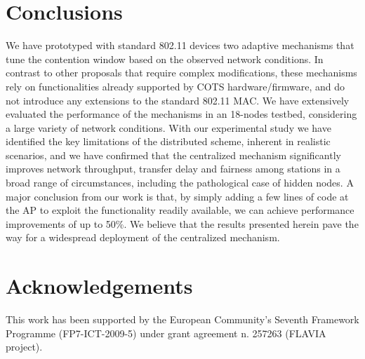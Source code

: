 \documentclass[a4paper,10pt]{article}
\begin{document}
\section{Conclusions}
\label{sec:conclusions}

We have prototyped with standard 802.11 devices two adaptive mechanisms that tune the contention window based on the observed network conditions. In contrast to other proposals that require complex modifications, these mechanisms rely on functionalities already supported by COTS hardware/firmware, and do not introduce any extensions to the standard 802.11 MAC. We have extensively evaluated the performance of the mechanisms in an 18-nodes testbed, considering a large variety of network conditions. With our experimental study we have identified the key limitations of the distributed scheme, inherent in realistic scenarios, and we have confirmed that the centralized mechanism significantly improves network throughput, transfer delay and fairness among stations in a broad range of circumstances, including the pathological case of hidden nodes. A major conclusion from our work is that, by simply adding a few lines of code at the AP to exploit the functionality readily available, we can achieve performance improvements of up to 50\%. We believe that the results presented herein pave the way for a widespread deployment of the centralized mechanism.

\section*{Acknowledgements}

This work has been supported by the European Community's Seventh Framework Programme (FP7-ICT-2009-5) under grant agreement n. 257263 (FLAVIA project). 



\end{document}
